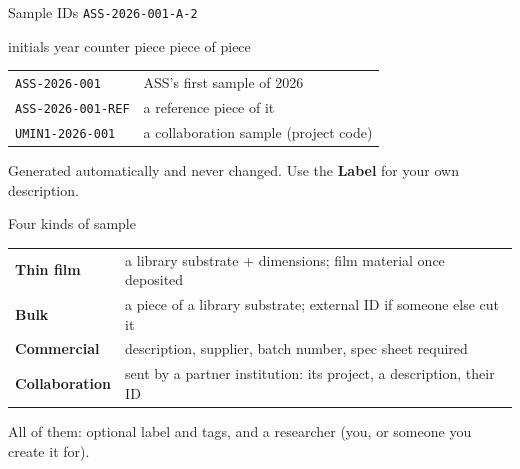 \documentclass[aspectratio=169,11pt]{beamer}
\newcommand{\ui}[1]{\textsf{\textbf{#1}}}
\newcommand{\sid}[1]{\texttt{#1}}
\begin{document}
\begin{frame}{Sample IDs}
  \centering
  \Large\sid{\alert{ASS}-\alert{2026}-\alert{001}-A-2}
  \normalsize

  \vspace{0.3cm}
  {\small initials \quad year \quad counter \quad piece \quad piece of piece}

  \vspace{0.6cm}
  \begin{tabular}{@{}ll@{}}
    \toprule
    \sid{ASS-2026-001}     & ASS's first sample of 2026 \\
    \sid{ASS-2026-001-REF} & a reference piece of it \\
    \sid{UMIN1-2026-001}   & a collaboration sample (project code) \\
    \bottomrule
  \end{tabular}

  \vspace{0.4cm}
  \small Generated automatically and never changed. Use the \ui{Label}
  for your own description.
\end{frame}

\begin{frame}{Four kinds of sample}
  \begin{tabular}{@{}lp{9.5cm}@{}}
    \toprule
    \textbf{Thin film}     & a library substrate + dimensions; film material once deposited \\
    \textbf{Bulk}          & a piece of a library substrate; external ID if someone else cut it \\
    \textbf{Commercial}    & description, supplier, batch number, \alert{spec sheet required} \\
    \textbf{Collaboration} & sent by a partner institution: its project, a description, their ID \\
    \bottomrule
  \end{tabular}

  \vspace{0.5cm}
  All of them: optional label and tags, and a researcher (you, or
  someone you create it for).
\end{frame}
\end{document}
